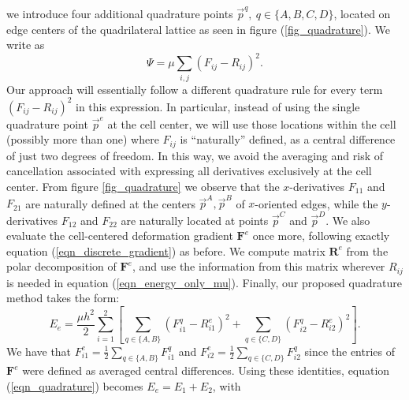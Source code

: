 \cite{harlow:1965:MAC}\cite{gerritsma:1996:viscoelastic,Goktekin:2004:viscoelastic}   we introduce four
additional quadrature points $\vec{p}^q,\ q\in\{A,B,C,D\}$, located on edge centers of the quadrilateral lattice as seen in figure (\ref{fig_quadrature}). We write \newtext{$\Psi$ }as
\begin{equation}
\Psi=\mu\sum_{i,j}
  (F_{ij}-R_{ij})^2.
\label{eqn_energy_only_mu}
\end{equation}
Our approach will essentially follow a different quadrature rule for every term $(F_{ij}-R_{ij})^2$ in this expression. In particular, instead of using the single quadrature point
$\vec{p}^e$ at the cell center, we will use those locations within the cell (possibly more than one) where $F_{ij}$ is ``naturally'' defined, as a central difference of just two degrees
of freedom. In this way, we avoid the averaging and risk of cancellation associated with expressing all derivatives exclusively at the cell center. From figure \ref{fig_quadrature} we
observe that the $x$-derivatives $F_{11}$ and $F_{21}$ are naturally defined at the centers $\vec{p}^A,\vec{p}^B$ of $x$-oriented edges, while the $y$-derivatives $F_{12}$ and $F_{22}$
are naturally located at points $\vec{p}^C$ and $\vec{p}^D$. We also evaluate the cell-centered deformation gradient $\mathbf{F}^e$ once more, following exactly equation
(\ref{eqn_discrete_gradient}) as before. We compute matrix $\mathbf{R}^e$ from the polar decomposition of $\mathbf{F}^e$, and use the information from this matrix wherever $R_{ij}$ is needed 
in equation (\ref{eqn_energy_only_mu}). Finally, our proposed quadrature method takes the form:
\begin{equation}
\!E_e=\frac{\mu h^2}{2}\sum_{i=1}^2\left[\sum_{q\in\{A,B\}}\!\!\!\!\left(F_{i1}^q\!-\!R_{i1}^e\right)^2+\!\!\!\!\sum_{q\in\{C,D\}}\!\!\!\!\left(F_{i2}^q\!-\!R_{i2}^e\right)^2\right].
\label{eqn_quadrature}
\end{equation}
We have that $F_{i1}^e\!=\!\frac{1}{2}\sum_{q\in\{A,B\}}F_{i1}^q$ and $F_{i2}^e\!=\!\frac{1}{2}\sum_{q\in\{C,D\}}F_{i2}^q$ since the entries of $\mathbf{F}^e$ were defined as averaged
central differences. Using these identities, equation (\ref{eqn_quadrature}) becomes $E_e=E_1+E_2$, with
